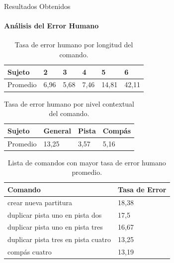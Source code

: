 \begin{frame}{Resultados Obtenidos}
\framesubtitle{An\'alisis del Error Humano}
\begin{table}[H]
\centering
\footnotesize
\begin{tabular}{|p{1.2cm}|p{1.0cm}|p{1.0cm}|p{1.0cm}|p{1.0cm}|p{1.0cm}|}
\hline
    Sujeto & 2 & 3 & 4 & 5 & 6  \\
    \hline 
    Promedio & 6,96 & 5,68 & 7,46 & 14,81 & 42,11 \\
\hline
\end{tabular}
\caption{Tasa de error humano por longitud del comando.}
\label{sec:error-longitud}
\end{table}


\begin{table}[H]
\centering
\footnotesize
\begin{tabular}{|p{1.6cm}|p{1.6cm}|p{1.6cm}|p{1.6cm}|}
\hline
    Sujeto & General & Pista & Comp\'as \\
\hline
Promedio & 13,25 & 3,57 & 5,16 \\
\hline
\end{tabular}
\caption{Tasa de error humano por nivel contextual del comando.}
\label{sec:error-contexto}
\end{table}


\begin{table}[H]
\centering
\footnotesize
\begin{tabular}{|l|p{3cm}|}
\hline
Comando & Tasa de Error \\
\hline
crear nueva partitura & 18,38 \\
duplicar pista uno en pista dos & 17,5 \\
duplicar pista uno en pista tres & 16,67 \\
duplicar pista tres en pista cuatro & 13,25 \\
comp\'as cuatro & 13,19 \\
\hline
\end{tabular}
\caption{Lista de comandos con mayor tasa de error humano promedio.}
\label{sec:tabla-lista-comandos-error}
\end{table}


\end{frame}


